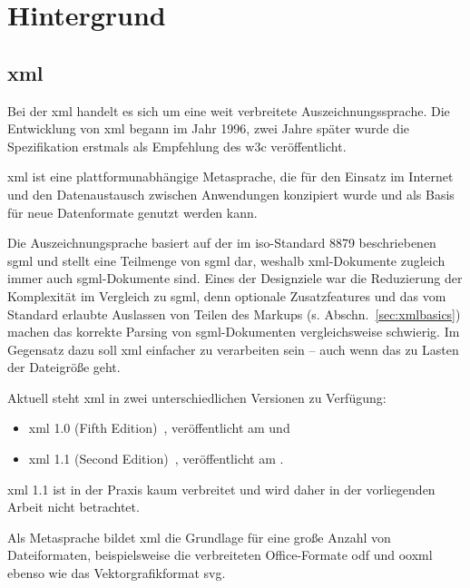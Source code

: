 \chapter{Hintergrund}
\label{chap:background}

\section{\acrfull{xml}}
\label{sec:xml}

Bei der \acrfull{xml} handelt es sich um eine weit verbreitete Auszeichnungssprache. Die Entwicklung von \acrshort{xml} begann im Jahr 1996, zwei Jahre später wurde die Spezifikation erstmals als Empfehlung des \acrfull{w3c} veröffentlicht.

\acrshort{xml} ist eine plattformunabhängige Metasprache, die für den Einsatz im Internet und den Datenaustausch zwischen Anwendungen konzipiert wurde und als Basis für neue Datenformate genutzt werden kann.

Die Auszeichnungsprache basiert auf der im \acrshort{iso}-Standard 8879 beschriebenen \acrfull{sgml} und stellt eine Teilmenge von \acrshort{sgml} dar, weshalb \acrshort{xml}-Dokumente zugleich immer auch \acrshort{sgml}-Dokumente sind. Eines der Designziele war die Reduzierung der Komplexität im Vergleich zu \acrshort{sgml}, denn optionale Zusatzfeatures und das vom Standard erlaubte Auslassen von Teilen des Markups (s. Abschn.~\ref{sec:xmlbasics}) machen das korrekte Parsing von \acrshort{sgml}-Dokumenten vergleichsweise schwierig. Im Gegensatz dazu soll \acrshort{xml} einfacher zu verarbeiten sein -- auch wenn das zu Lasten der Dateigröße geht.~\cite[Abschnitt 1.1 H15]{xml,bray1998axml}

Aktuell steht \acrshort{xml} in zwei unterschiedlichen Versionen zu Verfügung:
\begin{itemize}
    \item{} \acrshort{xml} 1.0 (Fifth Edition)~\cite{xml}, veröffentlicht am  und
    \item{} \acrshort{xml} 1.1 (Second Edition)~\cite{xml11}, veröffentlicht am .
\end{itemize}

\acrshort{xml} 1.1 ist in der Praxis kaum verbreitet und wird daher in der vorliegenden Arbeit nicht betrachtet.

Als Metasprache bildet \acrshort{xml} die Grundlage für eine große Anzahl von Dateiformaten, beispielsweise die verbreiteten Office-Formate \gls{odf} und \gls{ooxml} ebenso wie das Vektorgrafikformat \gls{svg}.


